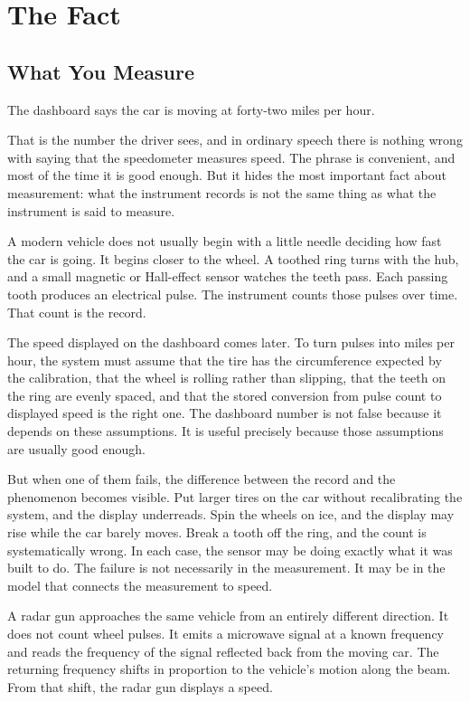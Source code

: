 \chapter{The Fact}
\label{chap:the-fact}

\section*{What You Measure}
\label{se:what-you-measure}

The dashboard says the car is moving at forty-two miles per hour.

That is the number the driver sees, and in ordinary speech there is nothing
wrong with saying that the speedometer measures speed. The phrase is convenient,
and most of the time it is good enough. But it hides the most important fact
about measurement: what the instrument records is not the same thing as what
the instrument is said to measure.

A modern vehicle does not usually begin with a little needle deciding how fast
the car is going. It begins closer to the wheel. A toothed ring turns with the
hub, and a small magnetic or Hall-effect sensor watches the teeth pass. Each
passing tooth produces an electrical pulse. The instrument counts those pulses
over time. That count is the record.

The speed displayed on the dashboard comes later. To turn pulses into miles per
hour, the system must assume that the tire has the circumference expected by
the calibration, that the wheel is rolling rather than slipping, that the teeth
on the ring are evenly spaced, and that the stored conversion from pulse count
to displayed speed is the right one. The dashboard number is not false because
it depends on these assumptions. It is useful precisely because those
assumptions are usually good enough.

But when one of them fails, the difference between the record and the
phenomenon becomes visible. Put larger tires on the car without recalibrating
the system, and the display underreads. Spin the wheels on ice, and the display
may rise while the car barely moves. Break a tooth off the ring, and the count
is systematically wrong. In each case, the sensor may be doing exactly what it
was built to do. The failure is not necessarily in the measurement. It may be in
the model that connects the measurement to speed.

A radar gun approaches the same vehicle from an entirely different direction.
It does not count wheel pulses. It emits a microwave signal at a known frequency
and reads the frequency of the signal reflected back from the moving car. The
returning frequency shifts in proportion to the vehicle's motion along the
beam. From that shift, the radar gun displays a speed.

